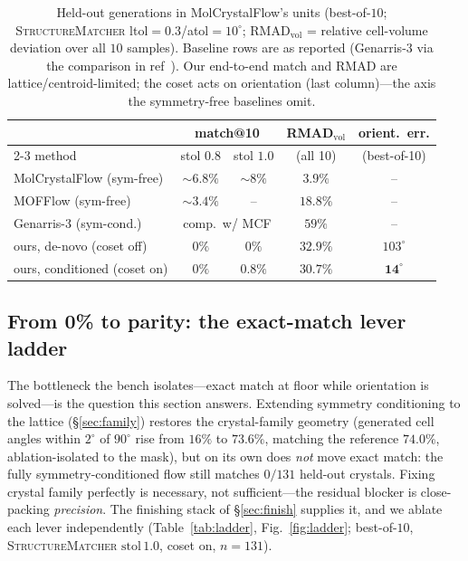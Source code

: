 \documentclass[journal=acsodf,manuscript=article]{achemso}
\begin{document}
\begin{table}[t]\centering
\caption{Held-out generations in MolCrystalFlow's units (best-of-$10$;
\textsc{StructureMatcher} ltol$=0.3$/atol$=10^\circ$; RMAD$_{\mathrm{vol}}$ =
relative cell-volume deviation over all $10$ samples). Baseline rows are as
reported\cite{zeng2026molcrystalflow,kim2025mofflow} (Genarris-3 via the comparison
in ref~). Our end-to-end match and RMAD are
lattice/centroid-limited; the coset acts on orientation (last column)---the axis
the symmetry-free baselines omit.}
\label{tab:bench}
\begin{tabular}{lcccc}\toprule
 & \multicolumn{2}{c}{match@10} & RMAD$_{\mathrm{vol}}$ & orient.\ err. \\
\cmidrule(lr){2-3}
method & stol $0.8$ & stol $1.0$ & (all 10) & (best-of-10) \\\midrule
MolCrystalFlow (sym-free)\cite{zeng2026molcrystalflow} & $\sim\!6.8\%$ & $\sim\!8\%$ & $3.9\%$ & -- \\
MOFFlow (sym-free)\cite{kim2025mofflow}                & $\sim\!3.4\%$ & --          & $18.8\%$ & -- \\
Genarris-3 (sym-cond.)                                 & \multicolumn{2}{c}{comp.\ w/ MCF} & $59\%$ & -- \\\midrule
ours, de-novo (coset off)                              & $0\%$ & $0\%$   & $32.9\%$ & $103^\circ$ \\
ours, conditioned (coset on)                           & $0\%$ & $0.8\%$ & $30.7\%$ & $\mathbf{14^\circ}$ \\\bottomrule
\end{tabular}
\end{table}

\subsection{From 0\% to parity: the exact-match lever ladder}\label{sec:ladder}
The bottleneck the bench isolates---exact match at floor while orientation is
solved---is the question this section answers. Extending symmetry conditioning to
the lattice (\S\ref{sec:family}) restores the crystal-family geometry (generated
cell angles within $2^\circ$ of $90^\circ$ rise from $16\%$ to $73.6\%$, matching
the reference $74.0\%$, ablation-isolated to the mask), but on its own does
\emph{not} move exact match: the fully symmetry-conditioned flow still matches
$0/131$ held-out crystals. Fixing crystal family perfectly is necessary, not
sufficient---the residual blocker is close-packing \emph{precision}. The finishing
stack of \S\ref{sec:finish} supplies it, and we ablate each lever independently
(Table~\ref{tab:ladder}, Fig.~\ref{fig:ladder}; best-of-$10$,
\textsc{StructureMatcher} $\text{stol}\,1.0$, coset on, $n{=}131$).
\end{document}
